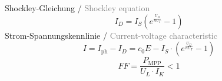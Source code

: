 \documentclass[12pt,a4paper]{article}
\def\gray#1{\textcolor{gray}{#1}}
\begin{document}
\-\ Shockley-Gleichung / \gray{Shockley equation}
\begin{equation}
    I_D = I_S \left( e^{\frac{U_D}{n U_T}} - 1 \right)
\end{equation}
\-\ Strom-Spannungskennlinie / \gray{Current-voltage characteristic}
\begin{equation}
    I = I_{\text{ph}} - I_D = c_0 E - I_S \cdot \left(e^{\frac{U_D}{n U_T}} - 1 \right)
\end{equation}
\begin{equation}
    FF = \frac{P_{\text{MPP}}}{U_L \cdot I_K} < 1
\end{equation}
\end{document}
